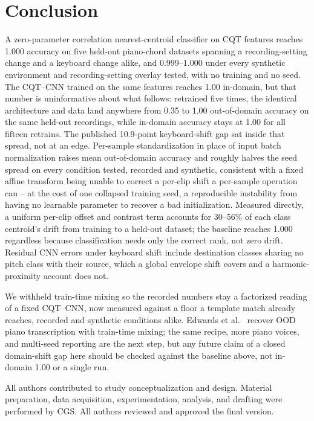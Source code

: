 \documentclass[pdflatex,sn-mathphys-num,iicol]{sn-jnl}
\theoremstyle{thmstyleone}
\theoremstyle{thmstyletwo}
\theoremstyle{thmstylethree}
\begin{document}
\section{Conclusion}\label{sec6}

A zero-parameter correlation nearest-centroid classifier on CQT features reaches 1.000 accuracy on five held-out piano-chord datasets spanning a recording-setting change and a keyboard change alike, and 0.999--1.000 under every synthetic environment and recording-setting overlay tested, with no training and no seed. The CQT--CNN trained on the same features reaches 1.00 in-domain, but that number is uninformative about what follows: retrained five times, the identical architecture and data land anywhere from 0.35 to 1.00 out-of-domain accuracy on the same held-out recordings, while in-domain accuracy stays at 1.00 for all fifteen retrains. The published 10.9-point keyboard-shift gap sat inside that spread, not at an edge. Per-sample standardization in place of input batch normalization raises mean out-of-domain accuracy and roughly halves the seed spread on every condition tested, recorded and synthetic, consistent with a fixed affine transform being unable to correct a per-clip shift a per-sample operation can -- at the cost of one collapsed training seed, a reproducible instability from having no learnable parameter to recover a bad initialization. Measured directly, a uniform per-clip offset and contrast term accounts for 30--56\% of each class centroid's drift from training to a held-out dataset; the baseline reaches 1.000 regardless because classification needs only the correct rank, not zero drift. Residual CNN errors under keyboard shift include destination classes sharing no pitch class with their source, which a global envelope shift covers and a harmonic-proximity account does not.

We withheld train-time mixing so the recorded numbers stay a factorized reading of a fixed CQT--CNN, now measured against a floor a template match already reaches, recorded and synthetic conditions alike. Edwards et al.\ \cite{Edwards2024} recover OOD piano transcription with train-time mixing; the same recipe, more piano voices, and multi-seed reporting are the next step, but any future claim of a closed domain-shift gap here should be checked against the baseline above, not in-domain 1.00 or a single run.

\backmatter

All authors contributed to study conceptualization and design. Material preparation, data acquisition, experimentation, analysis, and drafting were performed by CGS. All authors reviewed and approved the final version.
\end{document}

